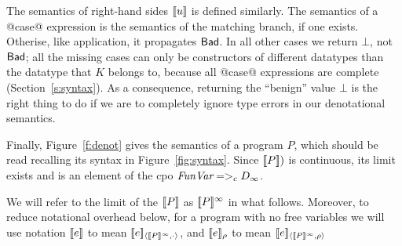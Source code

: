 The semantics of right-hand sides $[\![u]\!]$ is defined similarly.  The 
semantics of a @case@ expression is the semantics of the matching branch,
if one exists. Otherise, like application, it propagates $\mathsf{Bad}$.
In all other cases we return $\bot$, not $\mathsf{Bad}$; 
all the missing cases can only be constructors
of different datatypes than the datatype that $K$ belongs to, because
all @case@ expressions are complete (Section~\ref{s:syntax}).  As a
consequence, returning the ``benign'' value $\bot$ is the right thing
to do if we are to completely ignore type errors in our denotational
semantics. 

Finally, Figure~\ref{f:denot} gives the semantics of a program $P$, which should
be read recalling its syntax in Figure~\ref{fig:syntax}.
Since $[\![P]\!])$ is continuous, its limit exists and is an element of the 
cpo $\textit{FunVar} =>_c D_{\infty}$.

\begin{definition}
We will refer to the limit of the $[\![P]\!]$ as $[\![P]\!]^{\infty}$ in what follows. 
Moreover, to reduce notational overhead below, for a program with no free variables we 
will use notation $[\![e]\!]$ to mean $[\![e]\!]_{\langle {[\![P]\!]^\infty},{\cdot}\rangle}$, and
$[\![e]\!]_\rho$ to mean $[\![e]\!]_{\langle {[\![P]\!]^\infty},{\rho}\rangle}$
\end{definition}

